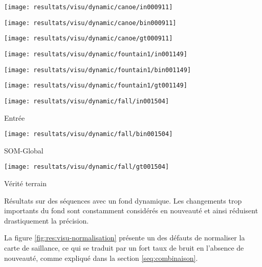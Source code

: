 	\begin{figureth}
		\begin{subfigureth}{.32\textwidth}
			\texttt{[image: resultats/visu/dynamic/canoe/in000911]}
		\end{subfigureth}
		\begin{subfigureth}{.32\textwidth}
			\texttt{[image: resultats/visu/dynamic/canoe/bin000911]}
		\end{subfigureth}
		\begin{subfigureth}{.32\textwidth}
			\texttt{[image: resultats/visu/dynamic/canoe/gt000911]}
		\end{subfigureth}

		\begin{subfigureth}{.32\textwidth}
			\texttt{[image: resultats/visu/dynamic/fountain1/in001149]}
		\end{subfigureth}
		\begin{subfigureth}{.32\textwidth}
			\texttt{[image: resultats/visu/dynamic/fountain1/bin001149]} 
		\end{subfigureth}
		\begin{subfigureth}{.32\textwidth}
			\texttt{[image: resultats/visu/dynamic/fountain1/gt001149]} 
		\end{subfigureth}

		\begin{subfigureth}{.32\textwidth}
			\texttt{[image: resultats/visu/dynamic/fall/in001504]} \caption{Entrée}
		\end{subfigureth}
		\begin{subfigureth}{.32\textwidth}
			\texttt{[image: resultats/visu/dynamic/fall/bin001504]} \caption{SOM-Global}
		\end{subfigureth}
		\begin{subfigureth}{.32\textwidth}
			\texttt{[image: resultats/visu/dynamic/fall/gt001504]} \caption{Vérité terrain}
		\end{subfigureth}
		\caption[Visualisation résultats dynamiques]{Résultats sur des séquences avec un fond dynamique. Les changements trop importants du fond sont constamment considérés en nouveauté et ainsi réduisent drastiquement la précision.}\label{fig:res:visu-dynamic}
	\end{figureth}

	La figure \ref{fig:res:visu-normalisation} présente un des défauts de normaliser la carte de saillance, ce qui se traduit par un fort taux de bruit en l'absence de nouveauté, comme expliqué dans la section \ref{seq:combinaison}.

